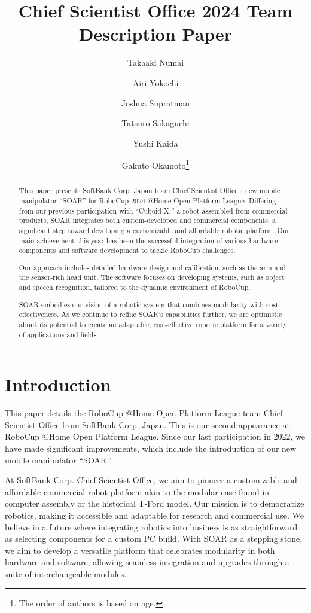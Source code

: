 \documentclass[runningheads,a4paper]{llncs}
\title{Chief Scientist Office 2024 Team Description Paper}
\author{Takaaki Numai \and Airi Yokochi \and Joshua Supratman \and Tatsuro Sakaguchi \and Yushi Kaida \and Gakuto Okamoto\thanks{The order of authors is based on age.}}
\institute{Affiliation name and address, \\
\texttt{http://devoted-web-site.url}}
\begin{document}
\maketitle

%
%

\begin{abstract}
	This paper presents SoftBank Corp. Japan team Chief Scientist Office’s new mobile manipulator “SOAR” for RoboCup 2024 @Home Open Platform League.
	Differing from our previous participation with “Cuboid-X,” a robot assembled from commercial products, SOAR integrates both custom-developed and commercial components, a significant step toward developing a customizable and affordable robotic platform.
	Our main achievement this year has been the successful integration of various hardware components and software development to tackle RoboCup challenges.

	Our approach includes detailed hardware design and calibration, such as the arm and the sensor-rich head unit.
	The software focuses on developing systems, such as object and speech recognition, tailored to the dynamic environment of RoboCup.

	SOAR embodies our vision of a robotic system that combines modularity with cost-effectiveness.
	As we continue to refine SOAR’s capabilities further, we are optimistic about its potential to create an adaptable, cost-effective robotic platform for a variety of applications and fields.

\end{abstract}



\section{Introduction}
This paper details the RoboCup @Home Open Platform League team Chief Scientist Office from SoftBank Corp. Japan.
This is our second appearance at RoboCup @Home Open Platform League.
Since our last participation in 2022, we have made significant improvements, which include the introduction of our new mobile manipulator “SOAR.”

At SoftBank Corp. Chief Scientist Office, we aim to pioneer a customizable and affordable commercial robot platform akin to the modular ease found in computer assembly or the historical T-Ford model.
Our mission is to democratize robotics, making it accessible and adaptable for research and commercial use.
We believe in a future where integrating robotics into business is as straightforward as selecting components for a custom PC build.
With SOAR as a stepping stone, we aim to develop a versatile platform that celebrates modularity in both hardware and software, allowing seamless integration and upgrades through a suite of interchangeable modules.
\end{document}
